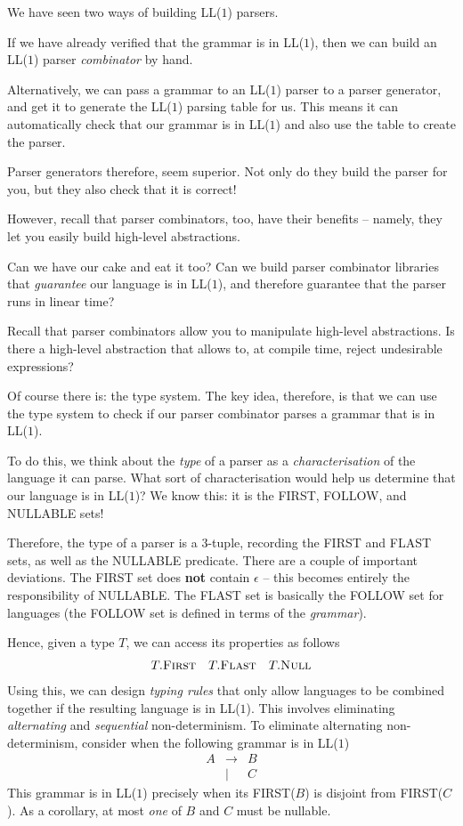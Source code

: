 We have seen two ways of building LL($1$) parsers.

If we have already verified that the grammar is in LL($1$), then we can build an LL($1$) parser \textit{combinator} by hand. 

Alternatively, we can pass a grammar to an LL($1$) parser to a parser generator, and get it to generate the LL($1$) parsing table for us. This means it can automatically check that our grammar is in LL($1$) and also use the table to create the parser.

Parser generators therefore, seem superior. Not only do they build the parser for you, but they also check that it is correct!

However, recall that parser combinators, too, have their benefits -- namely, they let you easily build high-level abstractions.

Can we have our cake and eat it too? Can we build parser combinator libraries that \textit{guarantee} our language is in LL($1$), and therefore guarantee that the parser runs in linear time?

Recall that parser combinators allow you to manipulate high-level abstractions. Is there a high-level abstraction that allows to, at compile time, reject undesirable expressions?

Of course there is: the type system. The key idea, therefore, is that we can use the type system to check if our parser combinator parses a grammar that is in LL($1$). 

To do this, we think about the \textit{type} of a parser as a \textit{characterisation} of the language it can parse. What sort of characterisation would help us determine that our language is in LL($1$)? We know this: it is the \textsf{FIRST}, \textsf{FOLLOW}, and \textsf{NULLABLE} sets!

Therefore, the type of a parser is a 3-tuple, recording the \textsf{FIRST} and \textsf{FLAST} sets, as well as the \textsf{NULLABLE} predicate. There are a couple of important deviations. The \textsf{FIRST} set does \textbf{not} contain $\epsilon$ -- this becomes entirely the responsibility of \textsf{NULLABLE}. The \textsf{FLAST} set is basically the \textsf{FOLLOW} set for languages (the \textsf{FOLLOW} set is defined in terms of the \textit{grammar}).

Hence, given a type $T$, we can access its properties as follows
\[
\begin{array}{ccc}
     T.\textsc{First} & T.\textsc{Flast} & T.\textsc{Null}  \\ 
\end{array}
\]
Using this, we can design \textit{typing rules} that only allow languages to be combined together if the resulting language is in LL($1$). This involves eliminating \textit{alternating} and \textit{sequential} non-determinism. To eliminate alternating non-determinism, consider when the following grammar is in LL($1$)
\[\begin{array}{rcl}
     A&\to&B  \\
     &\mid&C  
\end{array}\]
This grammar is in LL($1$) precisely when its \textsf{FIRST}($B$) is disjoint from \textsf{FIRST}($C$). As a corollary, at most \textit{one} of $B$ and $C$ must be nullable. 

